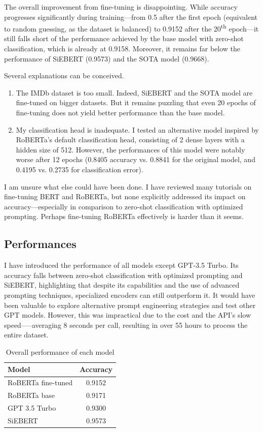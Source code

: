 \documentclass{article}
\begin{document}
The overall improvement from fine-tuning is disappointing. While accuracy progresses significantly during training—from 0.5 after the first epoch (equivalent to random guessing, as the dataset is balanced) to 0.9152 after the 20\textsuperscript{th} epoch—it still falls short of the performance achieved by the base model with zero-shot classification, which is already at 0.9158. Moreover, it remains far below the performance of SiEBERT (0.9573) and the SOTA model (0.9668).

Several explanations can be conceived.
\begin{enumerate}
    \item The IMDb dataset is too small. Indeed, SiEBERT and the SOTA model are fine-tuned on bigger datasets. But it remains puzzling that even 20 epochs of fine-tuning does not yield better performance than the base model. 
	\item My classification head is inadequate. I tested an alternative model inspired by RoBERTa’s default classification head, consisting of 2 dense layers with a hidden size of 512. However, the performances of this model were notably worse after 12 epochs (0.8405 accuracy vs. 0.8841 for the original model, and 0.4195 vs. 0.2735 for classification error).
\end{enumerate}

I am unsure what else could have been done. I have reviewed many tutorials on fine-tuning BERT and RoBERTa, but none explicitly addressed its impact on accuracy---especially in comparison to zero-shot classification with optimized prompting. Perhaps fine-tuning RoBERTa effectively is harder than it seems.

\subsection{Performances}

I have introduced the performance of all models except GPT-3.5 Turbo. Its accuracy falls between zero-shot classification with optimized prompting and SiEBERT, highlighting that despite its capabilities and the use of advanced prompting techniques, specialized encoders can still outperform it. It would have been valuable to explore alternative prompt engineering strategies and test other GPT models. However, this was impractical due to the cost and the API's slow speed--—averaging 8 seconds per call, resulting in over 55 hours to process the entire dataset.

\begin{table}
  \caption{Overall performance of each model}
  \label{tab:overall_perfs}
  \centering
  \begin{tabular}{lc}
    \toprule
    Model & Accuracy \\
    \midrule
    RoBERTa fine-tuned & 0.9152 \\
    RoBERTa base & 0.9171 \\
    GPT 3.5 Turbo & 0.9300 \\
    SiEBERT & 0.9573 \\
    \bottomrule
  \end{tabular}
\end{table}
\end{document}
